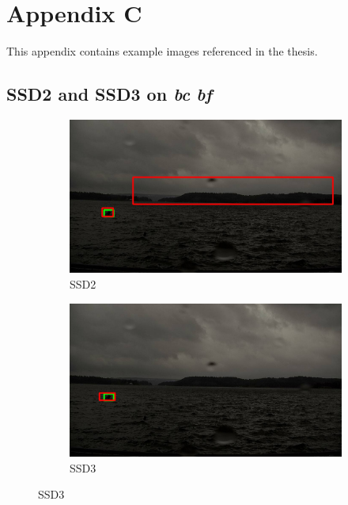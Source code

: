 \chapter{Appendix C}
This appendix contains example images referenced in the thesis.


\newpage

\section{SSD2 and SSD3 on \textit{bc} \textit{bf}}
\label{sec:bigbox}

\begin{figure}[h!]
\begin{subfigure}{.5\textwidth}
  \centering
  \includegraphics[width=0.9\linewidth]{results/case_buildings/bigbox_bcbf/SSD2/selected_06_14_axis0049.jpg}
  \caption{SSD2}
  \label{fig:sfig1}
\end{subfigure}%
\begin{subfigure}{.5\textwidth}
  \centering
  \includegraphics[width=.9\linewidth]{results/case_buildings/bigbox_bcbf/SSD3/selected_06_14_axis0049.jpg}
  \caption{SSD3}
  \label{fig:sfig2}
\end{subfigure}


\end{figure}
